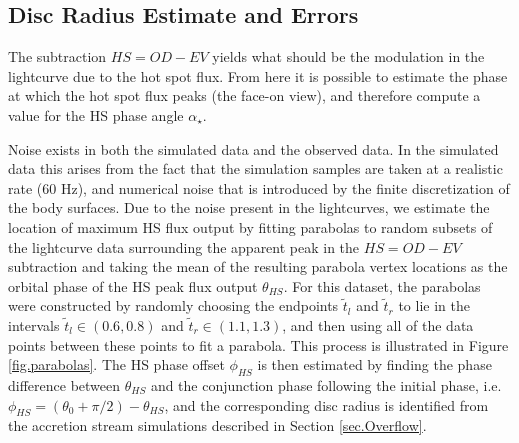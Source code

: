 \documentclass[preprint2]{aastex}
\newcommand{\note}[1]{[$\blacktriangleright$~\textbf{#1}~$\blacktriangleleft$]}
\begin{document}


\subsection{Disc Radius Estimate and Errors}

The subtraction $HS=OD-EV$ yields what should be the modulation in the
lightcurve due to the hot spot flux.  From here it is possible to
estimate the phase at which the hot spot flux peaks (the face-on view),
and therefore compute a value for the HS phase angle $\alpha_\star$.

Noise exists in both the simulated data and the observed data. In the simulated data this arises from the fact that the simulation samples are taken at a realistic rate (60 Hz), and numerical noise that is introduced by the finite discretization of the body surfaces. Due to the noise present in the lightcurves, we estimate the location of maximum HS flux output by fitting parabolas to random subsets of the lightcurve data surrounding the apparent peak in the $HS = OD - EV$ subtraction and taking the mean of the resulting parabola vertex locations as the orbital phase of the HS peak flux output $\theta_{HS}$. For this dataset, the parabolas were constructed by randomly choosing the endpoints $\tilde{t}_l$ and $\tilde{t}_r$ to lie in the intervals $\tilde{t}_l \in (0.6, 0.8)$ and $\tilde{t}_r \in (1.1, 1.3)$, and then using all of the data points between these points to fit a parabola. This process is illustrated in Figure \ref{fig.parabolas}. The HS phase offset $\phi_{HS}$ is then estimated by finding the phase difference between $\theta_{HS}$ and the conjunction phase following the initial phase, i.e. $\phi_{HS} = (\theta_0 + \pi/2) - \theta_{HS}$, and the corresponding disc radius is identified from the accretion stream simulations described in Section \ref{sec.Overflow}.
\end{document}
